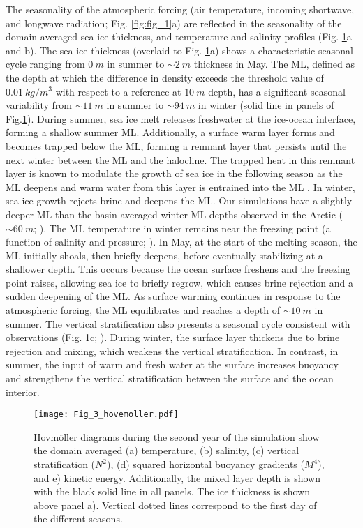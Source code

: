 \documentclass[draft]{agujournal2019}
\begin{document}
The seasonality of the atmospheric forcing (air temperature, incoming shortwave, and longwave radiation; Fig. \ref{fig:fig_1}a) are reflected in the seasonality of the domain averaged sea ice thickness, and temperature and salinity profiles (Fig. \ref{fig:fig_3}a and b). The sea ice thickness (overlaid to Fig. \ref{fig:fig_3}a) shows a characteristic seasonal cycle ranging from $0\ m$ in summer to $\sim 2\ m$ thickness in May. 
The ML, defined as the depth at which the difference in density exceeds the threshold value of $0.01\ kg/m^{3}$ with respect to a reference at $10\ m$ depth, has a significant seasonal variability from $\sim 11\ m$ in summer to $\sim 94\ m$ in winter (solid line in panels of Fig.\ref{fig:fig_3}). During summer, sea ice melt releases freshwater at the ice-ocean interface, forming a shallow summer ML. Additionally, a surface warm layer forms and becomes trapped below the ML, forming a remnant layer that persists until the next winter between the ML and the halocline. The trapped heat in this remnant layer is known to modulate the growth of sea ice in the following season as the ML deepens and warm water from this layer is entrained into the ML \citep{Cole_Remnant_2010,Mensa_seasonal_2017}. In winter, sea ice growth rejects brine and deepens the ML. Our simulations have a slightly deeper ML than the basin averaged winter ML depths observed in the Arctic ($\sim 60\ m$; \citealt{Zhai_seasonal_2023}). The ML temperature in winter remains near the freezing point (a function of salinity and pressure; \citealt{EOS_80}).
In May, at the start of the melting season, the ML initially shoals, then briefly deepens, before eventually stabilizing at a shallower depth. This occurs because the ocean surface freshens and the freezing point raises, allowing sea ice to briefly regrow, which causes brine rejection and a sudden deepening of the ML.
As surface warming continues in response to the atmospheric forcing, the ML equilibrates and reaches a depth of $\sim 10\ m$ in summer. 
The vertical stratification also presents a seasonal cycle consistent with observations (Fig. \ref{fig:fig_3}c; \citealt{Cole_stratification_2024}). During winter, the surface layer thickens due to brine rejection and mixing, which weakens the vertical stratification. In contrast, in summer, the input of warm and fresh water at the surface increases buoyancy and strengthens the vertical stratification between the surface and the ocean interior.

\begin{figure}
  \texttt{[image: Fig\_3\_hovemoller.pdf]}
  \caption{Hovm\"oller diagrams during the second year of the simulation show the domain averaged (a) temperature, (b) salinity, (c) vertical stratification ($N^2$), (d) squared horizontal buoyancy gradients ($M^4$), and e) kinetic energy. Additionally, the mixed layer depth is shown with the black solid line in all panels. The ice thickness is shown above panel a). Vertical dotted lines correspond to the first day of the different seasons.}
  \label{fig:fig_3}
\end{figure}
\end{document}
